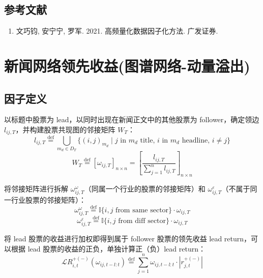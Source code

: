 \documentclass{article}
\begin{document}
\subsection{参考文献}
\begin{enumerate}
    \item 文巧钧, 安宁宁, 罗军. 2021. 高频量化数据因子化方法. 广发证券.
\end{enumerate}

\section{新闻网络领先收益(图谱网络-动量溢出)}

\subsection{因子定义}
以标题中股票为 lead，以同时出现在新闻正文中的其他股票为 follower，确定领边 \( l_{ij,T} \)，并构建股票共现图的邻接矩阵 \( W_T \)：
\begin{equation}
    l_{ij,T} \stackrel{\mathrm{def}}{=} \bigcup_{m_d \in D_T} \{(i,j)_{m_d} \mid j \text{ in } m_d \text{ title, } i \text{ in } m_d \text{ headline, } i \neq j\}
\end{equation}
\begin{equation}
    W_T \stackrel{\mathrm{def}}{=} [\omega_{ij,T}]_{n \times n} = \left[ \frac{l_{ij,T}}{\sum_{j=1}^n l_{ij,T}} \right]_{n \times n}
\end{equation}

将邻接矩阵进行拆解 \( \omega_{ij,T}^{\omega} \)（同属一个行业的股票的邻接矩阵）和 \( \omega_{ij,T}^{\varepsilon} \)（不属于同一行业股票的邻接矩阵）：
\begin{equation}
    \omega_{ij,T}^{\omega} \stackrel{\mathrm{def}}{=} \mathbb{I}\{i,j \text{ from same sector}\} \cdot \omega_{ij,T}
\end{equation}
\begin{equation}
    \omega_{ij,T}^{\varepsilon} \stackrel{\mathrm{def}}{=} \mathbb{I}\{i,j \text{ from diff sector}\} \cdot \omega_{ij,T}
\end{equation}

将 lead 股票的收益进行加权即得到属于 follower 股票的领先收益 lead return，可以根据 lead 股票的收益的正负，单独计算正（负）lead return：
\begin{equation}
    \mathcal{L}R_{i,t}^{+(-)} (\omega_{ij,t-l:t}) \stackrel{\mathrm{def}}{=} \sum_{j=1}^n \omega_{ij,t-l:t} \cdot |r_{j,t}^{+(-)}|
\end{equation}
\end{document}
